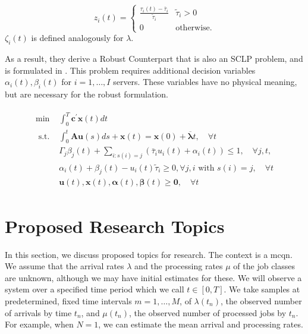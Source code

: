 \documentclass[11pt,a4paper,titlepage]{article}
\theoremstyle{definition}
\theoremstyle{plain}
\begin{document}
\begin{equation}
    z_i(t) =
    \begin{cases}
        \frac{\tau_i(t) - \bar{\tau}_i}{\tilde{\tau}_i} & \tilde{\tau}_i > 0 \\
        0 & \text{otherwise.}
    \end{cases}
\end{equation}
$\zeta_i(t)$ is defined analogously for $\lambda$.


As a result, they derive a Robust Counterpart that is also an SCLP problem,
and is formulated in .
This problem requires additional decision variables $\alpha_i(t), \beta_i(t)$
for $i=1,\ldots,I$ servers.
These variables have no physical meaning,
but are necessary for the robust formulation.

\begin{align}
\begin{split}
    \label{eq:mcqn-robust-counterpart}
    \min & \int_{0}^{T} \mathbf{c}^{\prime} \mathbf{x}(t) d t \\
    \text { s.t. } & \int_{0}^{t} \mathbf{A} \mathbf{u}(s) d s+\mathbf{x}(t)=\mathbf{x}(0)+\overline{\boldsymbol{\lambda}} t, \quad \forall t \\
    & \Gamma_{j} \beta_{j}(t)+\sum_{i: s(i)=j}\left(\bar{\tau}_{i} u_{i}(t)+\alpha_{i}(t)\right) \leq 1, \quad \forall j, t, \\
    & \alpha_{i}(t)+\beta_{j}(t)-u_{i}(t) \tilde{\tau}_{i} \geq 0, \forall j, i \text { with } s(i)=j, \quad \forall t \\
    & \mathbf{u}(t), \mathbf{x}(t), \boldsymbol{\alpha}(t), \boldsymbol{\beta}(t) \geq \mathbf{0}, \quad \forall t
\end{split}
\end{align}



\section{Proposed Research Topics}
\label{sec:topics}

In this section,
we discuss proposed topics for research.
The context is a \gls{mcqn}.
We assume that the arrival rates $\lambda$
and the processing rates $\mu$ of the job classes are unknown,
although we may have initial estimates for these.
We will observe a system over a specified time period which we call $t \in [0,T]$.
We take samples at predetermined,
fixed time intervals $m=1,\ldots,M$,
of $\lambda(t_n)$,
the observed number of arrivals by time $t_n$,
and $\mu(t_n)$,
the observed number of processed jobs by $t_n$.
For example,
when $N=1$,
we can estimate the mean arrival and processing rates.
\end{document}
